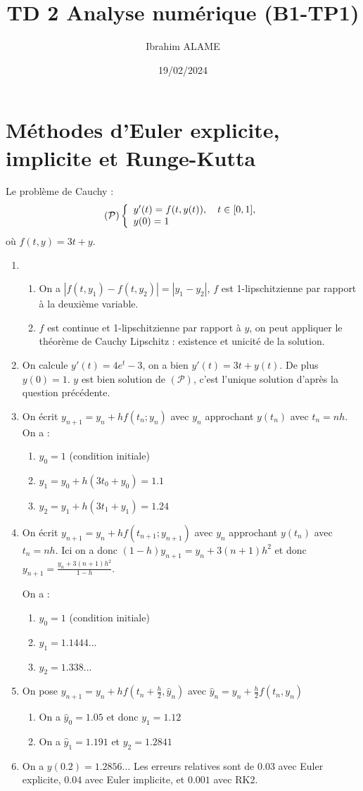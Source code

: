 \documentclass[a4paper]{article}
\title{TD 2 Analyse numérique (B1-TP1)}
\author{Ibrahim ALAME}
\date{19/02/2024}
\begin{document}
\maketitle

\section{Méthodes d'Euler explicite, implicite et Runge-Kutta}
Le problème de Cauchy :
\[({\cal P})\left\{\begin{array}{l}
y'(t)=f(t,y(t)),\quad t\in [0,1],\\
y(0)=1
\end{array}\right.\]
où $f(t, y) = 3t + y$.
\begin{enumerate}
\item  
\begin{enumerate}
\item  On a $|f(t, y_1) - f(t, y_2)|= |y_1 - y_2|$, $f$ est 1-lipschitzienne par rapport à la deuxième
variable.
\item $f$ est continue et 1-lipschitzienne par rapport à $y$, on peut appliquer le théorème
de Cauchy Lipschitz : existence et unicité de la solution.
\end{enumerate}
\item On calcule $y'(t) = 4e^t - 3$, on a bien $y'(t) = 3t + y(t)$. De plus $y(0) = 1$. $y$ est bien
solution de $(\mathcal{P})$, c'est l'unique solution d'après la question précédente.
\item On écrit $y_{n+1} = y_n + hf(t_n; y_n)$ avec $y_n$ approchant $y(t_n)$ avec $t_n = nh$.
On a :
\begin{enumerate}
\item $y_0 = 1$ (condition initiale)
\item $y_1 = y_0 + h(3t_0 + y_0) = 1.1$
\item $y_2 = y_1 + h(3t_1 + y_1) = 1.24$
\end{enumerate}

\item On écrit $y_{n+1} = y_n + hf(t_{n+1}; y_{n+1})$ avec $y_n$ approchant $y(t_n)$ avec $t_n = nh$. Ici on a donc $(1-h)y_{n+1} = y_n + 3(n + 1)h^2$ et donc $y_{n+1} =\frac{y_n + 3(n + 1)h^2}{1-h}$.

On a :
\begin{enumerate}
\item  $y_0 = 1$ (condition initiale)
\item  $y_1 = 1.1444...$
\item  $y_2 = 1.338... $
\end{enumerate}
\item On pose $y_{n+1} = y_n + hf(t_{n}+\frac h2,\hat{y}_{n})$ avec $\hat{y}_{n} = y_n + \frac h2f(t_{n},y_{n})$

\begin{enumerate}
\item  On a $\hat{y}_{0} = 1.05$ et donc $y_1 = 1.12$
\item  On a $\hat{y}_{1} = 1.191$ et $y_2 = 1.2841$
\end{enumerate}
\item  On a $y(0.2) = 1.2856...$
Les erreurs relatives sont de $0.03$ avec Euler explicite, $0.04$ avec Euler implicite, et $0.001$
avec RK2.
\end{enumerate}
\end{document}
